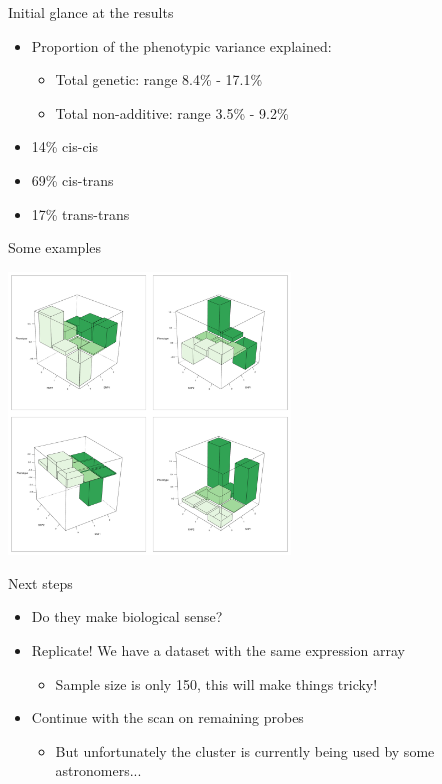 \documentclass{beamer}
\begin{document}
\begin{frame}{Initial glance at the results}
	\begin{itemize}
		\item Proportion of the phenotypic variance explained:
	\begin{itemize}
		\item Total genetic: range 8.4\% - 17.1\%
		\item Total non-additive: range 3.5\% - 9.2\%
	\end{itemize}
		\item 14\% cis-cis
		\item 69\% cis-trans
		\item 17\% trans-trans
	\end{itemize}
\end{frame}


\begin{frame}{Some examples}
	\begin{center}
		\includegraphics[height=7.5cm]{epistasis_examples}
	\end{center}
\end{frame}


\begin{frame}{Next steps}
	\begin{itemize}
		\item Do they make biological sense?
		\item Replicate! We have a dataset with the same expression array
		\begin{itemize}
			\item Sample size is only 150, this will make things tricky!
		\end{itemize}
		\item Continue with the scan on remaining probes
		\begin{itemize}
			\item But unfortunately the cluster is currently being used by some astronomers...
		\end{itemize}
	\end{itemize}
\end{frame}
\end{document}
